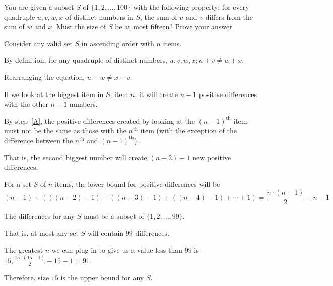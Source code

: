 \documentclass[11pt]{article}
\begin{document}
\begin{problems}


  \newpage

  \problem

  \begin{theorem}
      You are given a subset $S$ of $\{1,2,...,100\}$ with the following property:
        for every quadruple $u,v,w,x$ of distinct numbers in $S$, the sum of $u$ and $v$ 
        differs from the sum of $w$ and $x$.  Must the size of $S$ be at most fifteen?
        Prove your answer.
  \end{theorem}

  \smallskip

  \begin{longFormProof}

    \step Consider any valid set $S$ in ascending order with $n$ items.

    \step By definition, for any quadruple of distinct numbers, $u, v, w, x; u + v \neq w + x$.

    \step[A] Rearranging the equation, $u - w \neq x - v$.

    \step If we look at the biggest item in $S$, item $n$, it will create $n-1$ positive differences with the other $n-1$ numbers.

    \step By step~\ref{A}, the positive differences created by looking at the $(n-1)^\text{th}$ 
            item must not be the same as those with the $n^\text{th}$ item (with the exception 
            of the difference between the $n^\text{th}$ and $(n-1)^\text{th}$).

    \step That is, the second biggest number will create $(n-2)-1$ new positive differences.

    \step For a set $S$ of $n$ items, the lower bound for positive differences will be 
              $$(n-1) + (((n-2)-1) + ((n-3)-1) + ((n-4)-1) + \cdots + 1) = \frac{n\cdot (n-1)}{2} - n - 1$$

    \step The differences for any $S$ must be a subset of $\{1, 2,...,99\}$.

    \step That is, at most any set $S$ will contain $99$ differences.

    \step The greatest $n$ we can plug in to give us a value less than $99$ is $15, \frac{15\cdot (15-1)}{2} - 15 - 1 = 91$.

    \step Therefore, size $15$ is the upper bound for any $S$.


\end{longFormProof}
\end{problems}
\end{document}
